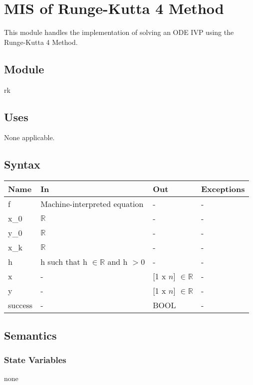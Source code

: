 \documentclass[12pt, titlepage]{article}
\begin{document}
\newpage

\section{MIS of Runge-Kutta 4 Method} \label{modRK}
This module handles the implementation of solving an ODE IVP using the Runge-Kutta 4 Method. 

\subsection{Module}
rk

\subsection{Uses}

None applicable.

\subsection{Syntax}

\begin{center}
\begin{tabular}{p{4cm} p{4cm} p{4cm} p{2cm}}
\hline
\textbf{Name} & \textbf{In} & \textbf{Out} & \textbf{Exceptions} \\
\hline
f & Machine-interpreted equation & - & -\\
x\_0 & $\mathbb{R}$ & - & -\\
y\_0 & $\mathbb{R}$ & - & -\\
x\_k & $\mathbb{R}$ & - & -\\
h & h such that h $\in \mathbb{R}$ and h $> 0$ & - & -\\
x & - & [1 x $n$] $\in \mathbb{R}$ & - \\
y & - & [1 x $n$] $\in \mathbb{R}$ & - \\
success & - & BOOL & - \\
\hline
\end{tabular}
\end{center}

\subsection{Semantics}

\subsubsection{State Variables}
none
\end{document}
